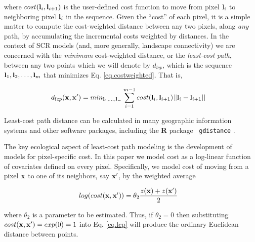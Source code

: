\documentclass[12pt]{article}
\begin{document}
\begin{spacing}{1.8}
{\flushleft
where } $cost({\bf l}_{i},{\bf l}_{i+1})$ is the user-defined cost function
to move
from pixel ${\bf l}_{i}$ to neighboring pixel ${\bf l}_{i}$ in the sequence.
Given the ``cost'' of each pixel, it is a simple matter to compute the
cost-weighted distance between any two pixels, along {\it any} path,
by accumulating the incremental  costs weighted by
distances.
In the context of
SCR models (and, more generally, landscape
connectivity) we are concerned with the {\it minimum} cost-weighted
distance, or the {\it least-cost path}, between any two points which
we will denote by $d_{lcp}$, which is
the
sequence ${\bf l}_{1},{\bf l}_{2},\ldots,{\bf l}_{m}$ that minimizes
Eq. \ref{eq.costweighted}. That is,

\begin{equation}
 d_{lcp}({\bf x},{\bf x}')
  =  min_{{\bf l}_{1},\ldots,{\bf l}_{m}}  \sum_{i=1}^{m-1} cost({\bf l}_{i},{\bf l}_{i+1})||{\bf l}_{i} - {\bf l}_{i+1}||
\label{eq.lcp}
\end{equation}

{\flushleft
 Least-cost} path distance can be calculated in
 many geographic information systems and other software packages,
including the {\bf R} package \mbox{\tt
  gdistance} \citep{vanetten:2011}.


The key ecological aspect of least-cost path modeling is the
development
of models for pixel-specific cost.
In this paper we model cost as a log-linear function of covariates
defined on every pixel.
Specifically, we model cost of
moving from a pixel ${\bf x}$ to one of its neighbors, say ${\bf
  x}'$, by the weighted average

\begin{equation}
 log(cost({\bf x},{\bf x}'))=  \theta_{2} \frac{z({\bf x})+z({\bf x}')}{2}
\label{eq.cost}
\end{equation}

{\flushleft
where $\theta_{2}$ is a parameter to be estimated.} Thus, if $\theta_{2} = 0$ then substituting $cost({\bf x},{\bf x}')
=exp(0) = 1$ into
Eq. \ref{eq.lcp} will produce the ordinary Euclidean distance
between points.


\end{spacing}
\end{document}

